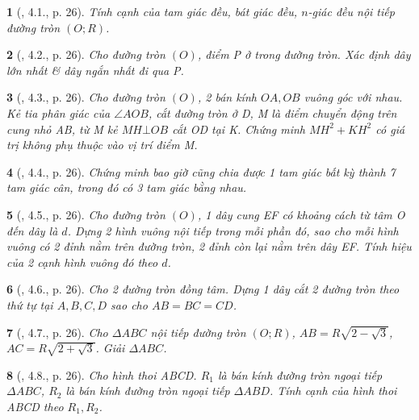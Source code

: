\documentclass{article}
\newtheorem{baitoan}{}
\begin{document}
\begin{baitoan}[\cite{TLCT_THCS_Toan_9_hinh_hoc}, 4.1., p. 26]
	Tính cạnh của tam giác đều, bát giác đều, $n$-giác đều nội tiếp đường tròn $(O;R)$.
\end{baitoan}

\begin{baitoan}[\cite{TLCT_THCS_Toan_9_hinh_hoc}, 4.2., p. 26]
	Cho đường tròn $(O)$, điểm P ở trong đường tròn. Xác định dây lớn nhất \& dây ngắn nhất đi qua P.
\end{baitoan}

\begin{baitoan}[\cite{TLCT_THCS_Toan_9_hinh_hoc}, 4.3., p. 26]
	Cho đường tròn $(O)$, 2 bán kính $OA,OB$ vuông góc với nhau. Kẻ tia phân giác của $\angle{AOB}$, cắt đường tròn ở D, M là điểm chuyển động trên cung nhỏ AB, từ M kẻ $MH\bot OB$ cắt OD tại K. Chứng minh $MH^2 + KH^2$ có giá trị không phụ thuộc vào vị trí điểm M.
\end{baitoan}

\begin{baitoan}[\cite{TLCT_THCS_Toan_9_hinh_hoc}, 4.4., p. 26]
	Chứng minh bao giờ cũng chia được 1 tam giác bất kỳ thành 7 tam giác cân, trong đó có 3 tam giác bằng nhau.
\end{baitoan}

\begin{baitoan}[\cite{TLCT_THCS_Toan_9_hinh_hoc}, 4.5., p. 26]
	Cho đường tròn $(O)$, 1 dây cung EF có khoảng cách từ tâm O đến dây là $d$. Dựng 2 hình vuông nội tiếp trong mỗi phần đó, sao cho mỗi hình vuông có 2 đỉnh nằm trên đường tròn, 2 đỉnh còn lại nằm trên dây EF. Tính hiệu của 2 cạnh hình vuông đó theo $d$.
\end{baitoan}

\begin{baitoan}[\cite{TLCT_THCS_Toan_9_hinh_hoc}, 4.6., p. 26]
	Cho 2 đường tròn đồng tâm. Dựng 1 dây cắt 2 đường tròn theo thứ tự tại $A,B,C,D$ sao cho $AB = BC = CD$.
\end{baitoan}

\begin{baitoan}[\cite{TLCT_THCS_Toan_9_hinh_hoc}, 4.7., p. 26]
	Cho $\Delta ABC$ nội tiếp đường tròn $(O;R)$, $AB = R\sqrt{2 - \sqrt{3}}$, $AC = R\sqrt{2 + \sqrt{3}}$. Giải $\Delta ABC$.
\end{baitoan}

\begin{baitoan}[\cite{TLCT_THCS_Toan_9_hinh_hoc}, 4.8., p. 26]
	Cho hình thoi ABCD. $R_1$ là bán kính đường tròn ngoại tiếp $\Delta ABC$, $R_2$ là bán kính đường tròn ngoại tiếp $\Delta ABD$. Tính cạnh của hình thoi ABCD theo $R_1,R_2$.
\end{baitoan}
\end{document}

